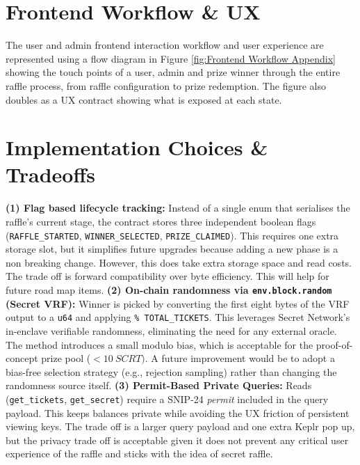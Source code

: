 \documentclass[8pt]{extarticle}
\begin{document}
\section{Frontend Workflow \& UX}
The user and admin frontend interaction workflow and user experience are represented using a flow diagram in Figure \ref{fig:Frontend Workflow Appendix} showing the touch points of a user, admin and prize winner through the entire raffle process, from raffle configuration to prize redemption. The figure also doubles as a UX contract showing what is exposed at each state.

\section{Implementation Choices \& Tradeoffs}

\textbf{(1) Flag based lifecycle tracking:} Instead of a single enum that serialises the raffle's current stage, the contract stores three independent boolean flags (\texttt{RAFFLE\_STARTED}, \texttt{WINNER\_SELECTED}, \texttt{PRIZE\_CLAIMED}). This requires one extra storage slot, but it simplifies future upgrades because adding a new phase is a non breaking change. However, this does take extra storage space and read costs. The trade off is forward compatibility over byte efficiency. This will help for future road map items. \textbf{(2) On-chain randomness via \texttt{env.block.random} (Secret VRF):} Winner is picked by converting the first eight bytes of the VRF output to a \texttt{u64} and applying \texttt{\% TOTAL\_TICKETS}. This leverages Secret Network's in-enclave verifiable randomness, eliminating the need for any external oracle. The method introduces a small modulo bias, which is acceptable for the proof-of-concept prize pool (\(<10~SCRT)\). A future improvement would be to adopt a bias-free selection strategy (e.g., rejection sampling) rather than changing the randomness source itself. \textbf{(3) Permit-Based Private Queries:} Reads (\texttt{get\_tickets}, \texttt{get\_secret}) require a SNIP-24 \emph{permit} included in the query payload. This keeps balances private while avoiding the UX friction of persistent viewing keys. The trade off is a larger query payload and one extra Keplr pop up, but the privacy trade off is acceptable given it does not prevent any critical user experience of the raffle and sticks with the idea of secret raffle.
\end{document}
